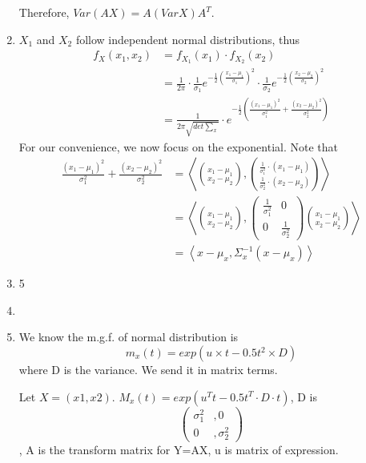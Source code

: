 \documentclass[12pt,a4paper]{article}
\makeatletter
\theoremstyle{definition}
\newtheorem*{solution}{Solution}
\renewenvironment{solution}[1][Solution] {\par\pushQED{\qed}\normalfont\topsep6\p@\@plus6\p@\relax\trivlist\item[\hskip\labelsep\bfseries#1\@addpunct{.}]\ignorespaces}{\popQED\endtrivlist\@endpefalse} \makeatother
\makeatother
\begin{document}
\begin{enumerate}[label=\roman*)]
    Therefore, $Var(AX)=A(VarX)A^T$.
    \item $X_1$ and $X_2$ follow independent normal distributions, thus
    \begin{equation*}
        \begin{split}
        f_X(x_1,x_2)&=f_{X_1}(x_1)\cdot f_{X_2}(x_2)\\
        &=\frac{1}{2\pi}\cdot \frac{1}{\sigma_1}e^{-\frac{1}{2}(\frac{x_1-\mu_1}{\sigma_1})^2}\cdot \frac{1}{\sigma_2}e^{-\frac{1}{2}(\frac{x_2-\mu_2}{\sigma_2})^2}\\
        &=\frac{1}{2\pi \sqrt{det\sum _x}}\cdot e^{-\frac{1}{2}(\frac{(x_1-\mu_1)^2}{\sigma_1^2}+\frac{(x_2-\mu_2)^2}{\sigma_2^2})}
        \end{split}
    \end{equation*}
    For our convenience, we now focus on the exponential. Note that
    \begin{equation*}
        \begin{split}
        \frac{(x_1-\mu_1)^2}{\sigma_1^2}+\frac{(x_2-\mu_2)^2}{\sigma_2^2}&=\left\langle \binom{x_1-\mu_1}{x_2-\mu_2}, \binom{\frac{1}{\sigma_1^2}\cdot (x_1-\mu_1)}{\frac{1}{\sigma_2^2}\cdot (x_2-\mu_2)} \right\rangle\\
        &=\left\langle \binom{x_1-\mu_1}{x_2-\mu_2}, \begin{pmatrix}
            \frac{1}{\sigma_1^2} & 0\\
            0 & \frac{1}{\sigma_2^2}
        \end{pmatrix}
        \binom{x_1-\mu_1}{x_2-\mu_2}
        \right\rangle\\
        &=\left\langle x-\mu_x, \Sigma_x^{-1} (x-\mu_x)\right\rangle
        \end{split}
    \end{equation*}
    \item 5
    \item \begin{solution}
        We know the m.g.f. of normal distribution is
        \begin{equation*}
            m_x\left(t\right)=exp\left(u\times t-0.5t^2\times D\right)
        \end{equation*}
        where D is the variance. We send it in matrix terms.

        Let $X=(x1,x2)$. $M_x(t)=exp(u^Tt-0.5t^T\cdot D\cdot t)$, D is 
        \begin{equation*}
            \begin{pmatrix}
                \sigma_1^2&,0\\
                0&,\sigma_2^2
            \end{pmatrix}
        \end{equation*}
        , A is the transform matrix for Y=AX, u is matrix of expression.
        

\end{solution}
\end{enumerate}
\end{document}
